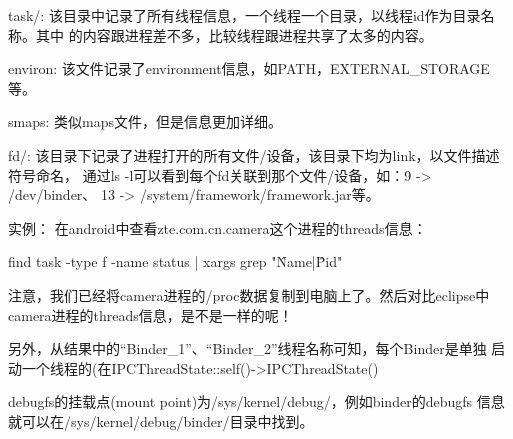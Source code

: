 ﻿\documentclass[a4paper,11pt]{article}
\begin{document}
  task/: 该目录中记录了所有线程信息，一个线程一个目录，以线程id作为目录名称。其中
  的内容跟进程差不多，比较线程跟进程共享了太多的内容。

  environ: 该文件记录了environment信息，如PATH，EXTERNAL\_STORAGE等。

  smaps: 类似maps文件，但是信息更加详细。

  fd/: 该目录下记录了进程打开的所有文件/设备，该目录下均为link，以文件描述符号命名，
  通过ls -l可以看到每个fd关联到那个文件/设备，如：9 -> /dev/binder、
  13 -> /system/framework/framework.jar等。

  \vspace{5pt}

  实例：
  在android中查看zte.com.cn.camera这个进程的threads信息：

  find task -type f -name status | xargs grep "\^Name\bs|\^Pid"

  注意，我们已经将camera进程的/proc数据复制到电脑上了。然后对比eclipse中
  camera进程的threads信息，是不是一样的呢！

  另外，从结果中的“Binder\_1”、“Binder\_2”线程名称可知，每个Binder是单独
  启动一个线程的(在IPCThreadState::self()->IPCThreadState()

  debugfs的挂载点(mount point)为/sys/kernel/debug/，例如binder的debugfs
  信息就可以在/sys/kernel/debug/binder/目录中找到。
\end{document}
